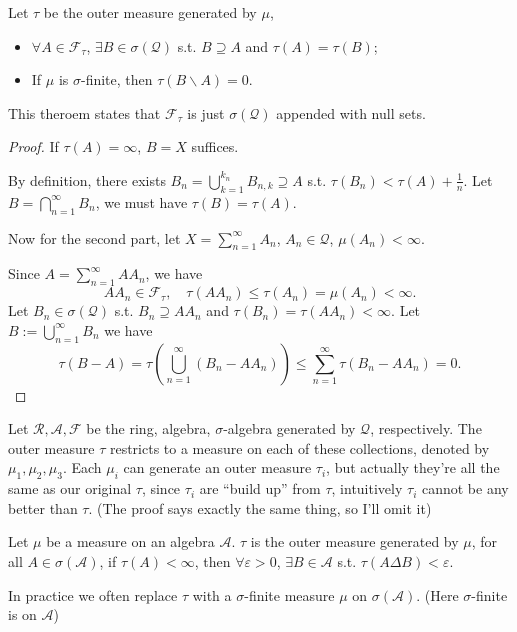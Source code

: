 \begin{theorem}
    Let $\tau$ be the outer measure generated by $\mu$,
	\begin{itemize}
		\item $\forall A\in \mathscr{F}_\tau$, $\exists B\in \sigma(\mathscr{Q})$
			s.t. $B\supseteq A$ and $\tau(A) = \tau(B)$;
		\item If $\mu$ is $\sigma$-finite, then $\tau(B\backslash A) = 0$.
	\end{itemize}
\end{theorem}
\begin{remark}
    This theroem states that $\mathscr{F}_\tau$ is just $\sigma(\mathscr{Q})$
	appended with null sets.
\end{remark}

\begin{proof}[Proof]
	If $\tau(A) = \infty$, $B = X$ suffices.

    By definition, there exists $B_n = \bigcup_{k=1}^{k_n} B_{n,k}\supseteq A$
	s.t. $\tau(B_n)<\tau(A)+\frac{1}{n}$.
	Let $B = \bigcap_{n=1}^\infty B_n$, we must have $\tau(B) = \tau(A)$.

	Now for the second part, let $X = \sum_{n=1}^{\infty} A_n$,
	$A_n\in \mathscr{Q}$, $\mu(A_n)<\infty$.

	Since $A = \sum_{n=1}^{\infty}AA_n$,
	we have
	\[
	AA_n\in \mathscr{F}_\tau,\quad \tau(AA_n)\le \tau(A_n) = \mu(A_n) <\infty.
	\]
	Let $B_n\in \sigma(\mathscr{Q})$ s.t. $B_n \supseteq AA_n$
	and $\tau(B_n) = \tau(AA_n)<\infty$.
	Let $B := \bigcup_{n=1}^\infty B_n$ we have
	\[
	\tau(B-A) = \tau\left(\bigcup_{n=1}^\infty (B_n - AA_n)\right)\le
	\sum_{n=1}^{\infty}\tau(B_n -AA_n) = 0.
	\]
\end{proof}

Let $\mathscr{R},\mathscr{A},\mathscr{F}$ be the ring, algebra, $\sigma$-algebra
generated by $\mathscr{Q}$, respectively.
The outer measure $\tau$ restricts to a measure on each of these collections,
denoted by $\mu_1,\mu_2,\mu_3$.
Each $\mu_i$ can generate an outer measure $\tau_i$, but actually they're all
the same as our original $\tau$, since $\tau_i$ are ``build up'' from $\tau$,
intuitively $\tau_i$ cannot be any better than $\tau$. (The proof
says exactly the same thing, so I'll omit it)

\begin{proposition}
    Let $\mu$ be a measure on an algebra $\mathscr{A}$. $\tau$ is the outer
	measure generated by $\mu$, for all $A\in \sigma(\mathscr{A})$,
	if $\tau(A)<\infty$, then $\forall \varepsilon>0$, $\exists B\in \mathscr{A}$
	s.t. $\tau(A\Delta B)<\varepsilon$.
\end{proposition}
\begin{remark}
    In practice we often replace $\tau$ with a $\sigma$-finite
	measure $\mu$ on $\sigma(\mathscr{A})$.
	(Here $\sigma$-finite is on $\mathscr{A}$)
\end{remark}

